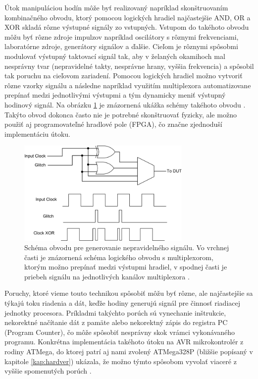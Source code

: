 Útok manipuláciou hodín môže byť realizovaný napríklad skonštruovaním kombinačného obvodu, ktorý pomocou logických hradiel najčastejšie AND, OR a XOR skladá rôzne výstupné signály zo vstupných. Vstupom do takéhoto obvodu môžu byť rôzne zdroje impulzov napríklad oscilátory s rôznymi frekvenciami, laboratórne zdroje, generátory signálov a ďalšie. Cieľom je rôznymi spôsobmi modulovať výstupný taktovací signál tak, aby v želaných okamihoch mal nesprávny tvar (nepravidelné takty, nesprávne hrany, vyššia frekvencia) a spôsobil tak poruchu na cieľovom zariadení. Pomocou logických hradiel možno vytvoriť rôzne vzorky signálu a následne napríklad využitím multiplexora automatizovane prepínať medzi jednotlivými výstupmi a tým dynamicky meniť výstupný hodinový signál. Na obrázku \ref{obr:clock} je znázornená ukážka schémy takéhoto obvodu \cite{clockCircuit}. Takýto obvod dokonca často nie je potrebné skonštruovať fyzicky, ale možno použiť aj programovateľné hradlové pole (FPGA), čo značne zjednoduší implementáciu útoku.

\begin{figure}
    \centerline{\includegraphics[width=0.75\textwidth]{images/clock.png}}
    \caption[Schéma obvodu pre generovanie nepravidelného signálu]{Schéma obvodu pre generovanie nepravidelného signálu. Vo vrchnej časti je znázornená schéma logického obvodu s multiplexorom, ktorým možno prepínať medzi výstupmi hradiel, v spodnej časti je priebeh signálu na jednotlivých kanálov multiplexora \cite{clockCircuit}.}
    \label{obr:clock}
\end{figure}

Poruchy, ktoré vieme touto technikou spôsobiť môžu byť rôzne, ale najčastejšie sa týkajú toku riadenia a dát, keďže hodiny generujú signál pre činnosť riadiacej jednotky procesora. Príkladmi takýchto porúch sú vynechanie inštrukcie, nekorektné načítanie dát z pamäte alebo nekorektný zápis do registra PC (Program Counter), čo môže spôsobiť nesprávny skok vrámci vykonávaného programu. Konkrétna implementácia takéhoto útoku na AVR mikrokontrolér z rodiny ATMega, do ktorej patrí aj nami zvolený ATMega328P (bližšie popísaný v kapitole \ref{kap:hardver}) ukázala, že možno týmto spôsobom vyvolať viaceré z vyššie spomenutých porúch \cite{clock}.

